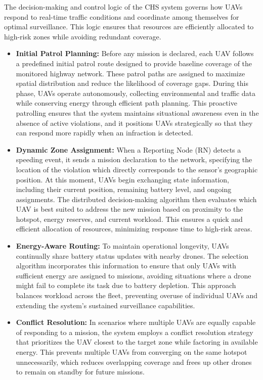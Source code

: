 The decision-making and control logic of the CHS system governs how UAVs respond to real-time traffic conditions and coordinate among themselves for optimal surveillance. This logic ensures that resources are efficiently allocated to high-risk zones while avoiding redundant coverage.

\begin{itemize}
    \item \textbf{Initial Patrol Planning:}  
    Before any mission is declared, each UAV follows a predefined initial patrol route designed to provide baseline coverage of the monitored highway network. These patrol paths are assigned to maximize spatial distribution and reduce the likelihood of coverage gaps. During this phase, UAVs operate autonomously, collecting environmental and traffic data while conserving energy through efficient path planning. This proactive patrolling ensures that the system maintains situational awareness even in the absence of active violations, and it positions UAVs strategically so that they can respond more rapidly when an infraction is detected.

    \item \textbf{Dynamic Zone Assignment:}  
    When a Reporting Node (RN) detects a speeding event, it sends a mission declaration to the network, specifying the location of the violation which directly corresponds to the sensor’s geographic position. At this moment, UAVs begin exchanging state information, including their current position, remaining battery level, and ongoing assignments. The distributed decision-making algorithm then evaluates which UAV is best suited to address the new mission based on proximity to the hotspot, energy reserves, and current workload. This ensures a quick and efficient allocation of resources, minimizing response time to high-risk areas.

    \item \textbf{Energy-Aware Routing:}  
    To maintain operational longevity, UAVs continually share battery status updates with nearby drones. The selection algorithm incorporates this information to ensure that only UAVs with sufficient energy are assigned to missions, avoiding situations where a drone might fail to complete its task due to battery depletion. This approach balances workload across the fleet, preventing overuse of individual UAVs and extending the system’s sustained surveillance capabilities.

    \item \textbf{Conflict Resolution:}  
    In scenarios where multiple UAVs are equally capable of responding to a mission, the system employs a conflict resolution strategy that prioritizes the UAV closest to the target zone while factoring in available energy. This prevents multiple UAVs from converging on the same hotspot unnecessarily, which reduces overlapping coverage and frees up other drones to remain on standby for future missions.


\end{itemize}
